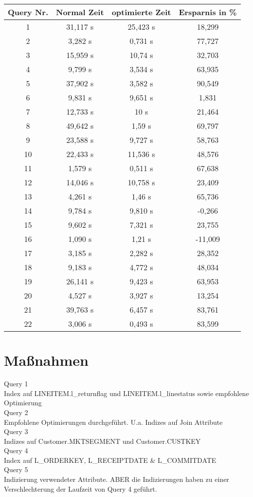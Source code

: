 \documentclass[12pt]{article}
\begin{document}
\begin{tabular}{cccc}
Query Nr. & Normal Zeit & optimierte Zeit & Ersparnis in \%	\\
\hline
1	&	31,117 s	&	25,423 s	&	18,299\\
2	& 	3,282 s	&	0,731 s	&	77,727\\
3	&	15,959 s	&	10,74 s	&	32,703\\
4	&	9,799 s	&	3,534 s	&	63,935\\
5	&	37,902 s	&	3,582 s	&	90,549\\
6	&	9,831 s	&	9,651 s	&	1,831\\
7	&	12,733 s	&	10 s		&	21,464\\
8	&	49,642 s	&	1,59 s	&	69,797\\
9	&	23,588 s	&	9,727 s	&	58,763\\
10	&	22,433 s	& 	11,536 s	&	48,576\\
11	&	1,579 s	&	0,511 s	&	67,638\\
12	&	14,046 s	&	10,758 s	&	23,409\\
13	&	4,261 s	&	1,46 s	&	65,736\\
14	&	9,784 s	&	9,810 s	&	-0,266\\
15	&	9,602 s	&	7,321 s	&	23,755\\
16	&	1,090 s	&	1,21 s	&	-11,009\\
17	&	3,185 s	&	2,282 s	&	28,352\\
18	&	9,183 s	&	4,772 s	&	48,034\\
19	&	26,141 s	&	9,423 s	&	63,953\\
20	&	4,527 s	&	3,927 s	&	13,254\\
21	&	39,763 s	&	6,457 s	&	83,761\\
22	&	3,006 s	&	0,493 s	&	83,599\\

\end{tabular}

\newpage
\section{Maßnahmen}

Query 1\\
Index auf LINEITEM.l\_returnflag und LINEITEM.l\_linestatus sowie empfohlene Optimierung \\
Query 2\\
Empfohlene Optimierungen durchgeführt. U.a. Indizes auf Join Attribute \\
Query 3\\
Indizes auf Customer.MKTSEGMENT und Customer.CUSTKEY \\
Query 4\\
Index auf L\_ORDERKEY, L\_RECEIPTDATE \& L\_COMMITDATE\\
Query 5\\
Indizierung verwendeter Attribute. ABER die Indizierungen haben zu einer Verschlechterung der Laufzeit von Query 4 geführt.
\end{document}
